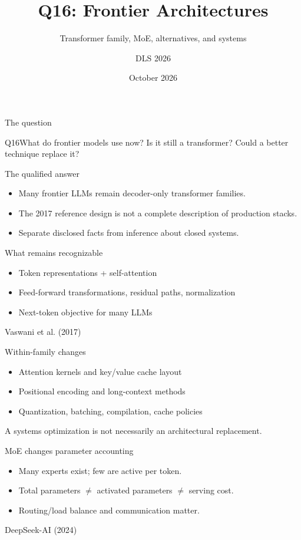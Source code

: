 \documentclass[aspectratio=169,10pt]{beamer}\usetheme{metropolis}
\title{Q16: Frontier Architectures}\subtitle{Transformer family, MoE, alternatives, and systems}\author{DLS 2026}\date{October 2026}
\begin{document}
\maketitle
\begin{frame}{The question}\begin{block}{Q16}What do frontier models use now? Is it still a transformer? Could a better technique replace it?\end{block}\end{frame}
\begin{frame}{The qualified answer}\begin{itemize}\item Many frontier LLMs remain decoder-only transformer families.\item The 2017 reference design is not a complete description of production stacks.\item Separate disclosed facts from inference about closed systems.\end{itemize}\end{frame}
\begin{frame}{What remains recognizable}\begin{itemize}\item Token representations + self-attention\item Feed-forward transformations, residual paths, normalization\item Next-token objective for many LLMs\end{itemize}\vfill\small Vaswani et al. (2017)\end{frame}
\begin{frame}{Within-family changes}\begin{itemize}\item Attention kernels and key/value cache layout\item Positional encoding and long-context methods\item Quantization, batching, compilation, cache policies\end{itemize}\alert{A systems optimization is not necessarily an architectural replacement.}\end{frame}
\begin{frame}{MoE changes parameter accounting}\begin{itemize}\item Many experts exist; few are active per token.\item Total parameters $\ne$ activated parameters $\ne$ serving cost.\item Routing/load balance and communication matter.\end{itemize}\vfill\small DeepSeek-AI (2024)\end{frame}
\end{document}
